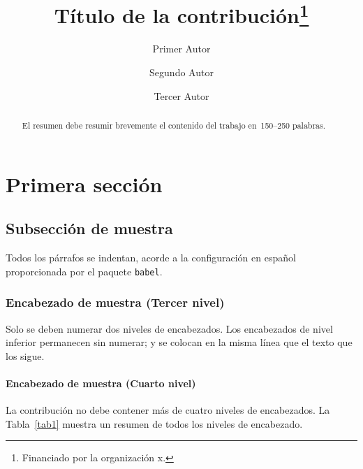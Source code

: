 \documentclass{sistedes}
\begin{document}
%
\title{Título de la contribución\thanks{Financiado por la organización x.}}
%
%
\author{Primer Autor \and
Segundo Autor \and
Tercer Autor}
%
%

%
\maketitle              %
%
\begin{abstract}
El resumen debe resumir brevemente el contenido del trabajo en~150--250 palabras.

\end{abstract}
%
%
%
\section{Primera sección}
\subsection{Subsección de muestra}
Todos los párrafos se indentan, acorde a la configuración en español 
proporcionada por el paquete \verb|babel|.

\subsubsection{Encabezado de muestra (Tercer nivel)}
Solo se deben numerar dos niveles de encabezados. Los encabezados de nivel
inferior permanecen sin numerar; y se colocan en la misma línea que el texto
que los sigue.

\paragraph{Encabezado de muestra (Cuarto nivel)}
La contribución no debe contener más de cuatro niveles de encabezados.
La Tabla~\ref{tab1} muestra un resumen de todos los niveles de encabezado.
\end{document}
